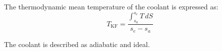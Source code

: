 The thermodynamic mean temperature of the coolant is expressed as:  
\[
T_{\text{KF}} = \frac{\int_{s_a}^{s_e} T \, dS}{s_e - s_a}
\]  

The coolant is described as adiabatic and ideal.